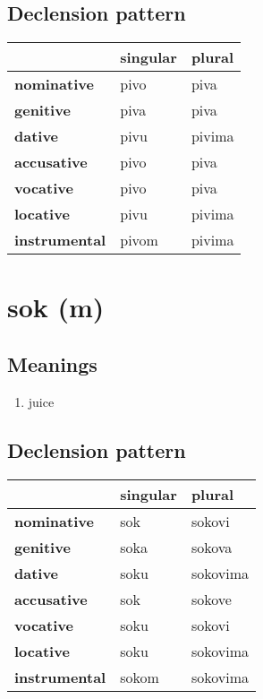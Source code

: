 \subsection*{Declension pattern}
\begin{tabularx}{\linewidth}{Xll}
\toprule
{} & singular &  plural \\
\midrule
\textbf{nominative  } &     pivo &    piva \\
\textbf{genitive    } &     piva &    piva \\
\textbf{dative      } &     pivu &  pivima \\
\textbf{accusative  } &     pivo &    piva \\
\textbf{vocative    } &     pivo &    piva \\
\textbf{locative    } &     pivu &  pivima \\
\textbf{instrumental} &    pivom &  pivima \\
\bottomrule
\end{tabularx}

\filbreak
\section{sok (m)}
\subsection*{Meanings}
\begin{enumerate}
\item juice
\end{enumerate}
\subsection*{Declension pattern}
\begin{tabularx}{\linewidth}{Xll}
\toprule
{} & singular &    plural \\
\midrule
\textbf{nominative  } &      sok &    sokovi \\
\textbf{genitive    } &     soka &    sokova \\
\textbf{dative      } &     soku &  sokovima \\
\textbf{accusative  } &      sok &    sokove \\
\textbf{vocative    } &     soku &    sokovi \\
\textbf{locative    } &     soku &  sokovima \\
\textbf{instrumental} &    sokom &  sokovima \\
\bottomrule
\end{tabularx}


